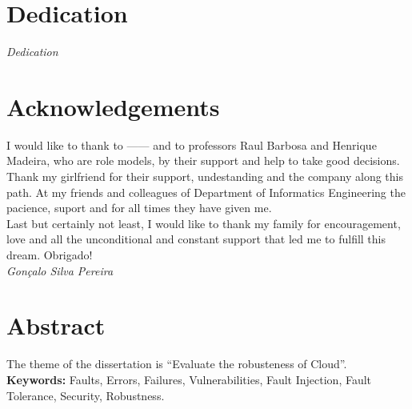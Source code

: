 
\section*{Dedication}

\emph{Dedication}


\newpage

\section*{Acknowledgements}

I would like to thank to ------ and to professors Raul Barbosa and Henrique Madeira, who are role models, by their support and help to take good decisions.\\

Thank my girlfriend for their support, undestanding and the company along this path. At my friends and colleagues of Department of Informatics Engineering the pacience, suport and for all times they have given me. \\

Last but certainly not least, I would like to thank my family for encouragement, love and all the unconditional and constant support that led me to fulfill this dream. Obrigado!\\



\emph{\hfill Gonçalo Silva Pereira}

\newpage

\section*{Abstract}

The theme of the dissertation is ``Evaluate the robusteness of Cloud''.\\

\textbf{Keywords:} Faults, Errors, Failures, Vulnerabilities, Fault Injection, Fault Tolerance, Security, Robustness.
